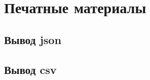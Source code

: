 \section{Печатные материалы}\label{app:Г}

\subsection{Вывод json}\label{app:Г1}

\begingroup
\captiondelim{ } %

\endgroup

\subsection{Вывод csv}\label{app:Г2}

\begingroup
\captiondelim{ } %

\endgroup